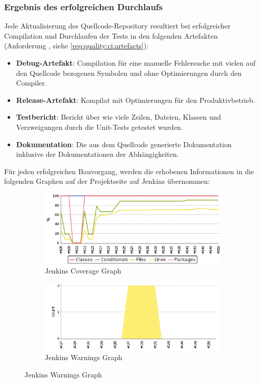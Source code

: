 \subsubsection{Ergebnis des erfolgreichen Durchlaufs}
Jede Aktualisierung des Quellcode-Repository resultiert bei erfolgreicher Compilation und Durchlaufen der Tests in den folgenden Artefakten (Anforderung , siehe \autoref{req:quality:ci:artefacts}):
\begin{itemize}
	\item \textbf{Debug-Artefakt}: Compilation für eine manuelle Fehlersuche mit vielen auf den Quellcode bezogenen Symbolen und ohne Optimierungen durch den Compiler.
	\item \textbf{Release-Artefakt}: Kompilat mit Optimierungen für den Produktivbetrieb.
	\item \textbf{Testbericht}: Bericht über wie viele Zeilen, Dateien, Klassen und Verzweigungen durch die Unit-Tests getestet wurden.
	\item \textbf{Dokumentation}: Die aus dem Quellcode generierte Dokumentation inklusive der Dokumentationen der Abhängigkeiten.
\end{itemize}

Für jeden erfolgreichen Bauvorgang, werden die erhobenen Informationen in die folgenden Graphen auf der Projektseite auf Jenkins übernommen:

\begin{figure}[H]
	\centering
	\begin{subfigure}{.5\textwidth}
		\includegraphics[width=\textwidth]{images/jenkins_coverage_graph.png}
		\caption{Jenkins Coverage Graph}
		\label{impl:jenkins:coverage:graph}
	\end{subfigure}%
	\begin{subfigure}{.5\textwidth}
		\includegraphics[width=\textwidth]{images/jenkins_warnings_graph.png}
		\caption{Jenkins Warnings Graph}
		\label{impl:jenkins:warnings:graph}
	\end{subfigure}
\end{figure}

